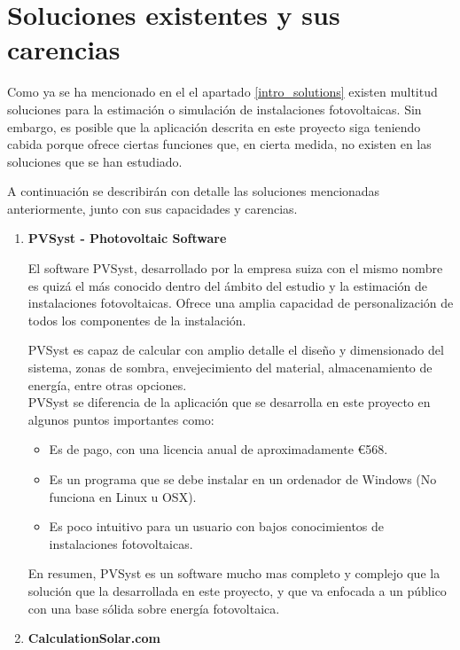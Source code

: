 \section{Soluciones existentes y sus carencias} \label{existing_solutions}

Como ya se ha mencionado en el el apartado \ref{intro_solutions}  existen multitud soluciones para la estimación o simulación de instalaciones fotovoltaicas. Sin embargo, es posible que la aplicación descrita en este proyecto siga teniendo cabida porque ofrece ciertas funciones que, en cierta medida, no existen en las soluciones que se han estudiado.

A continuación se describirán con detalle las soluciones mencionadas anteriormente, junto con sus capacidades y carencias.
\pagebreak

\begin{enumerate}
\item \textbf{PVSyst - Photovoltaic Software} \cite{sota_pvsyst}

El software PVSyst, desarrollado por la empresa suiza con el mismo nombre es quizá el más conocido dentro del ámbito del estudio y la estimación de instalaciones fotovoltaicas. Ofrece una amplia capacidad de personalización de todos los componentes de la instalación.

PVSyst es capaz de calcular con amplio detalle el diseño y dimensionado del sistema, zonas de sombra, envejecimiento del material, almacenamiento de energía, entre otras opciones.\\

PVSyst se diferencia de la aplicación que se desarrolla en este proyecto en algunos puntos importantes como:
	\begin{itemize}
		\item Es de pago, con una licencia anual de aproximadamente \euro{568}.
		\item Es un programa que se debe instalar en un ordenador de Windows (No funciona en Linux u OSX).
		\item Es poco intuitivo para un usuario con bajos conocimientos de instalaciones fotovoltaicas.
	\end{itemize}
En resumen, PVSyst es un software mucho mas completo y complejo que la solución que la desarrollada en este proyecto, y que va enfocada a un público con una base sólida sobre energía fotovoltaica.

\item \textbf{CalculationSolar.com} \cite{sota_calculationsolar}


\end{enumerate}

